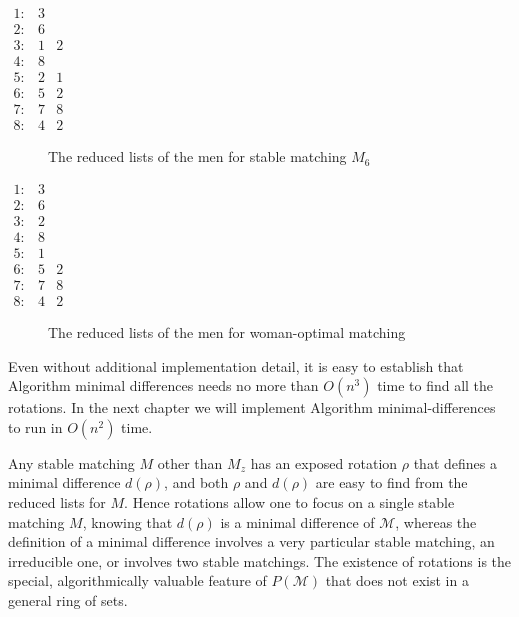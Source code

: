 \begin{center}
    $\begin{array}{lll}1: & 3 & \\ 2: & 6 & \\ 3: & 1 & 2 \\ 4: & 8 & \\ 5: & 2 & 1 \\ 6: & 5 & 2 \\ 7: & 7 & 8 \\ 8: & 4 & 2\end{array}$
    \begin{figure}[ht]
  \centering
  \caption{The reduced lists of the men for stable matching $M_6$}
  \label{FIG_3_8}
\end{figure}
\end{center}

\begin{center}
    $\begin{array}{lll}1: & 3 & \\ 2: & 6 & \\ 3: & 2 & \\ 4: & 8 & \\ 5: & 1 & \\ 6: & 5 & 2 \\ 7: & 7 & 8 \\ 8: & 4 & 2\end{array}$
    \begin{figure}[ht]
  \centering
  \caption{The reduced lists of the men for woman-optimal matching}
  \label{FIG_3_9}
\end{figure}
\end{center}



Even without additional implementation detail, it is easy to establish that Algorithm minimal differences needs no more than $O\left(n^3\right)$ time to find all the rotations. In the next chapter we will implement Algorithm minimal-differences to run in $O\left(n^2\right)$ time.

Any stable matching $M$ other than $M_z$ has an exposed rotation $\rho$ that defines a minimal difference $d(\rho)$, and both $\rho$ and $d(\rho)$ are easy to find from the reduced lists for $M$. Hence rotations allow one to focus on a single stable matching $M$, knowing that $d(\rho)$ is a minimal difference of $\mathcal{M}$, whereas the definition of a minimal difference involves a very particular stable matching, an irreducible one, or involves two stable matchings. The existence of rotations is the special, algorithmically valuable feature of $P(\mathcal{M})$ that does not exist in a general ring of sets.
